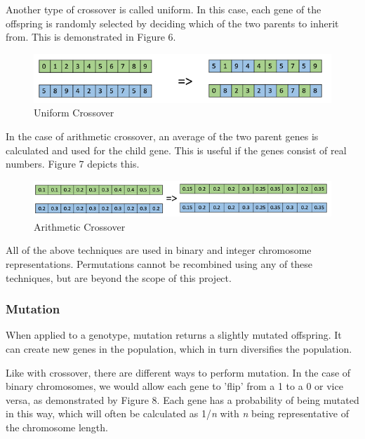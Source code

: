 \documentclass[12pt,a4paper]{article}
\begin{document}
Another type of crossover is called uniform. In this case, each gene of the offspring is randomly selected by deciding which of the two parents to inherit from. This is demonstrated in Figure 6.

\begin{figure}[h]
	\centering
	\includegraphics[width = \textwidth]{uniform_crossover.jpg}
	\caption{Uniform Crossover}
\end{figure}


In the case of arithmetic crossover, an average of the two parent genes is calculated and used for the child gene. This is useful if the genes consist of real numbers. Figure 7 depicts this.

\begin{figure}[h]
	\centering
	\includegraphics[width = \textwidth]{arith_crossover.png}
	\caption{Arithmetic Crossover}
\end{figure}

All of the above techniques are used in binary and integer chromosome representations. Permutations cannot be recombined using any of these techniques, but are beyond the scope of this project. 

\subsubsection{Mutation}
When applied to a genotype, mutation returns a slightly mutated offspring\citep{IntroductionToEvolutionaryComputing}. It can create new genes in the population, which in turn diversifies the population. 

Like with crossover, there are different ways to perform mutation. In the case of binary chromosomes, we would allow each gene to 'flip' from a 1 to a 0 or vice versa, as demonstrated by Figure 8. Each gene has a probability of being mutated in this way, which will often be calculated as 1/\textit{n} with \textit{n} being representative of the chromosome length.
\end{document}
